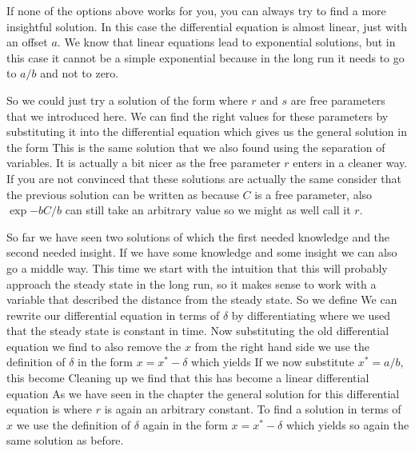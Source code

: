 If none of the options above works for you, you can always try to find a more insightful solution. In this case the differential equation is almost linear, just with an offset $a$. We know that linear equations lead to exponential solutions, but in this case it cannot be a simple exponential because in the long run it needs to go to $a/b$ and not to zero.  

So we could just try a solution of the form 
where $r$ and $s$ are free parameters that we introduced here. We can find the right values for these parameters by substituting it into the differential equation 
which gives us the general solution in the form 
This is the same solution that we also found using the separation of variables. It is actually a bit nicer as the free parameter $r$ enters in a cleaner way. If you are not convinced that these solutions are actually the same consider that the previous solution can be written as   
because $C$ is a free parameter, also $\exp{-bC}/b$ can still take an arbitrary value so we might as well call it $r$. 

So far we have seen two solutions of which the first needed knowledge and the second needed insight. If we have some knowledge and some insight we can also go a middle way. This time we start with the intuition that this will probably approach the steady state in the long run, so it makes sense to work with a variable that described the distance from the steady state. So we define 
We can rewrite our differential equation in terms of $\delta$ by differentiating 
where we used that the steady state is constant in time. Now substituting the old differential equation we find 
to also remove the $x$ from the right hand side we use the definition of $\delta$ in the form $x=x^*-\delta$ which yields 
If we now substitute $x^*=a/b$, this become 
Cleaning up we find that this has become a linear differential equation 
As we have seen in the chapter the general solution for this differential equation is 
where $r$ is again an arbitrary constant. To find a solution in terms of $x$ we use the definition of $\delta$ again in the form $x=x^*-\delta$ which yields 
so again the same solution as before. 


